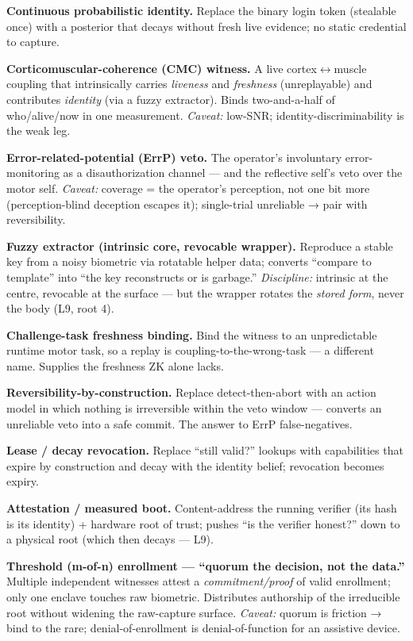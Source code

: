 \documentclass[11pt]{article}
\begin{document}
\textbf{Continuous probabilistic identity.} Replace the binary login token (stealable once) with a posterior that decays without fresh live evidence; no static credential to capture.

\textbf{Corticomuscular-coherence (CMC) witness.} A live cortex\ensuremath{\leftrightarrow}muscle coupling that intrinsically carries \emph{liveness} and \emph{freshness} (unreplayable) and contributes \emph{identity} (via a fuzzy extractor). Binds two-and-a-half of who/\allowbreak{}alive/\allowbreak{}now in one measurement. \emph{Caveat:} low-SNR; identity-discriminability is the weak leg.

\textbf{Error-related-potential (ErrP) veto.} The operator's involuntary error-monitoring as a disauthorization channel — and the reflective self's veto over the motor self. \emph{Caveat:} coverage = the operator's perception, not one bit more (perception-blind deception escapes it); single-trial unreliable → pair with reversibility.

\textbf{Fuzzy extractor (intrinsic core, revocable wrapper).} Reproduce a stable key from a noisy biometric via rotatable helper data; converts ``compare to template'' into ``the key reconstructs or is garbage.'' \emph{Discipline:} intrinsic at the centre, revocable at the surface — but the wrapper rotates the \emph{stored form}, never the body (L9, root 4).

\textbf{Challenge-task freshness binding.} Bind the witness to an unpredictable runtime motor task, so a replay is coupling-to-the-wrong-task — a different name. Supplies the freshness ZK alone lacks.

\textbf{Reversibility-by-construction.} Replace detect-then-abort with an action model in which nothing is irreversible within the veto window — converts an unreliable veto into a safe commit. The answer to ErrP false-negatives.

\textbf{Lease /\allowbreak{} decay revocation.} Replace ``still valid?'' lookups with capabilities that expire by construction and decay with the identity belief; revocation becomes expiry.

\textbf{Attestation /\allowbreak{} measured boot.} Content-address the running verifier (its hash is its identity) + hardware root of trust; pushes ``is the verifier honest?'' down to a physical root (which then decays — L9).

\textbf{Threshold (m-of-n) enrollment — ``quorum the decision, not the data.''} Multiple independent witnesses attest a \emph{commitment/\allowbreak{}proof} of valid enrollment; only one enclave touches raw biometric. Distributes authorship of the irreducible root without widening the raw-capture surface. \emph{Caveat:} quorum is friction → bind to the rare; denial-of-enrollment is denial-of-function for an assistive device.
\end{document}

